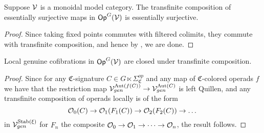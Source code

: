 \documentclass[a4paper,10pt
,draft
]{article}%
\renewcommand{\1}{\eta}%
\newcommand{\SC}{\Sigma_{\mathfrak C}}
\begin{document}
\begin{lemma}
      \label{TRANSCOMP_ES_LEM}
      Suppose $\mathcal V$ is a monoidal model category.
      The transfinite composition of essentially surjective maps in $\mathsf{Op}^G(\mathcal V)$ is essentially surjective.
\end{lemma}
\begin{proof}
      Since taking fixed points commutes with filtered colimits, they commute with transfinite composition,
      and hence by \cite[4.17]{Cav}, we are done.
\end{proof}

\begin{lemma}
      \label{TRANSCOMP_LGC_LEM}
      Local genuine cofibrations in $\mathsf{Op}^G(\mathcal V)$ are closed under transfinite composition.
\end{lemma}
\begin{proof}
      Since for any $\mathfrak C$-signature $C \in G \ltimes \SC^{op}$ and any map of $\mathfrak C$-colored operads $f$ we have that
      the restriction map
      $\mathcal V^{\operatorname{Aut}(f(C))}_{gen} \to \mathcal V^{\operatorname{Aut}(C)}_{gen}$
      is left Quillen,
      and any transfinite composition of operads locally is of the form
      \begin{equation}
            \mathcal{O}_0(C) \to \mathcal{O}_1(F_1(C)) \to \mathcal{O}_2(F_2(C)) \to \dots   
      \end{equation}
      in $\mathcal V^{\mathrm{Stab}(\xi)}_{gen}$
      for $F_n$ the composite $\mathcal{O}_0 \to \mathcal{O}_1 \to \dots \to \mathcal{O}_n$,
      the result follows.
\end{proof}
\end{document}
